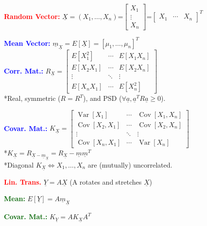 \documentclass[5pt]{extarticle} %
\begin{document}
\begin{paracol}{3}
{    \textcolor{red}{\textbf{Random Vector:}} $\underline{X} = (X_1,\ldots,X_n) \text{=} \begin{bmatrix} X_1 \\ \vdots \\ X_n \end{bmatrix} \text{=} \begin{bmatrix} X_1 & \cdots & X_n \end{bmatrix}^T$

    \textcolor{blue}{\textbf{Mean Vector:}} $\underline{m}_{\underline{X}} = E[\underline{X}] = [\mu_1, \ldots, \mu_n]^T$ \\

    \textcolor{blue}{\textbf{Corr. Mat.:}} $R_{\underline{X}} =
    \begin{bmatrix}
    E[X_1^2]  & \cdots & E[X_1 X_n] \\
    E[X_2 X_1] & \cdots & E[X_2 X_n] \\
    \vdots & \ddots & \vdots \\
    E[X_n X_1] & \cdots & E[X_n^2]
    \end{bmatrix}$ \\
    *Real, symmetric ($R=R^T$), and PSD ($\forall \underline{a}, \underline{a}^T R \underline{a} \geq 0$).

    \textcolor{blue}{\textbf{Covar. Mat.:}} $K_{\underline{X}} =
    \begin{bmatrix}
    \operatorname{Var}[X_1] & \cdots & \operatorname{Cov}[X_1, X_n] \\
    \operatorname{Cov}[X_2, X_1] & \cdots & \operatorname{Cov}[X_2, X_n] \\
    \vdots & \ddots & \vdots \\
    \operatorname{Cov}[X_n, X_1] & \cdots & \operatorname{Var}[X_n]
    \end{bmatrix}$ \\
    *$K_{\underline{X}} = R_{\underline{X} - \underline{m}_{\underline{X}}} = R_{\underline{X}} - \underline{m} \underline{m}^T$ \\
    *Diagonal $K_{\underline{X}} \iff X_1, \ldots, X_n$ are (mutually) uncorrelated.

    \textcolor{red}{\textbf{Lin. Trans.}} $\underline{Y} = A \underline{X}$ (A rotates and stretches $\underline{X}$)

    \textcolor{darkgreen}{\textbf{Mean:}} $E[\underline{Y}] = A \underline{m}_{\underline{X}}$

    \textcolor{darkgreen}{\textbf{Covar. Mat.:}} $K_{\underline{Y}} = A K_{\underline{X}} A^T$

}
\end{paracol}
\end{document}
